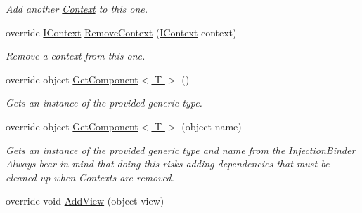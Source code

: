 \begin{DoxyCompactItemize}
\begin{DoxyCompactList}\small\item\em Add another \hyperlink{classstrange_1_1extensions_1_1context_1_1impl_1_1_context}{Context} to this one. \end{DoxyCompactList}\item 
\hypertarget{classstrange_1_1extensions_1_1context_1_1impl_1_1_m_v_c_s_context_a2a069cafa02893c41915b47d5e03269d}{override \hyperlink{interfacestrange_1_1extensions_1_1context_1_1api_1_1_i_context}{I\-Context} \hyperlink{classstrange_1_1extensions_1_1context_1_1impl_1_1_m_v_c_s_context_a2a069cafa02893c41915b47d5e03269d}{Remove\-Context} (\hyperlink{interfacestrange_1_1extensions_1_1context_1_1api_1_1_i_context}{I\-Context} context)}\label{classstrange_1_1extensions_1_1context_1_1impl_1_1_m_v_c_s_context_a2a069cafa02893c41915b47d5e03269d}

\begin{DoxyCompactList}\small\item\em Remove a context from this one. \end{DoxyCompactList}\item 
override object \hyperlink{classstrange_1_1extensions_1_1context_1_1impl_1_1_m_v_c_s_context_a094adf14d43505eaa0d5c2c786c2e5f9}{Get\-Component$<$ T $>$} ()
\begin{DoxyCompactList}\small\item\em Gets an instance of the provided generic type. \end{DoxyCompactList}\item 
override object \hyperlink{classstrange_1_1extensions_1_1context_1_1impl_1_1_m_v_c_s_context_a6ea387573cba1bfe0a629dec3d1e6b37}{Get\-Component$<$ T $>$} (object name)
\begin{DoxyCompactList}\small\item\em Gets an instance of the provided generic type and name from the Injection\-Binder Always bear in mind that doing this risks adding dependencies that must be cleaned up when Contexts are removed. \end{DoxyCompactList}\item 
\hypertarget{classstrange_1_1extensions_1_1context_1_1impl_1_1_m_v_c_s_context_ae93688d0d17d6523f11d37c6ffee93a0}{override void \hyperlink{classstrange_1_1extensions_1_1context_1_1impl_1_1_m_v_c_s_context_ae93688d0d17d6523f11d37c6ffee93a0}{Add\-View} (object view)}\label{classstrange_1_1extensions_1_1context_1_1impl_1_1_m_v_c_s_context_ae93688d0d17d6523f11d37c6ffee93a0}


\end{DoxyCompactItemize}

